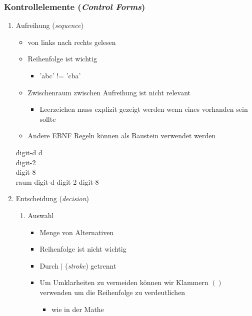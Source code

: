 \documentclass[11pt]{article}
\begin{document}
\subsubsection{Kontrollelemente (\emph{Control Forms})}
\label{sec:orgb3186a5}
\begin{enumerate}
\item Aufreihung (\emph{sequence})
\label{sec:orgba00afa}
\begin{itemize}
\item von links nach rechts gelesen\\
\item Reihenfolge ist wichtig\\
\begin{itemize}
\item 'abc' != 'cba'\\
\end{itemize}
\item Zwischenraum zwischen Aufreihung ist nicht relevant\\
\begin{itemize}
\item Leerzeichen muss explizit gezeigt werden wenn eines vorhanden sein sollte\\
\end{itemize}
\item Andere EBNF Regeln können als Baustein verwendet werden\\
\end{itemize}
digit-d \Leftarrow d\\
digit-2 \\
digit-8 \\
raum \Leftarrow digit-d digit-2 digit-8\\

\item Entscheidung (\emph{decision})
\label{sec:org0eb593a}
\begin{enumerate}
\item Auswahl
\label{sec:orgccb8870}
\begin{itemize}
\item Menge von Alternativen\\
\item Reihenfolge ist nicht wichtig\\
\item Durch \(|\) (\emph{stroke}) getrennt\\
\item Um Umklarheiten zu vermeiden können wir Klammern \(()\)  verwenden um die Reihenfolge zu verdeutlichen\\
\begin{itemize}
\item wie in der Mathe\\
\end{itemize}
\end{itemize}


\end{enumerate}
\end{enumerate}
\end{document}
